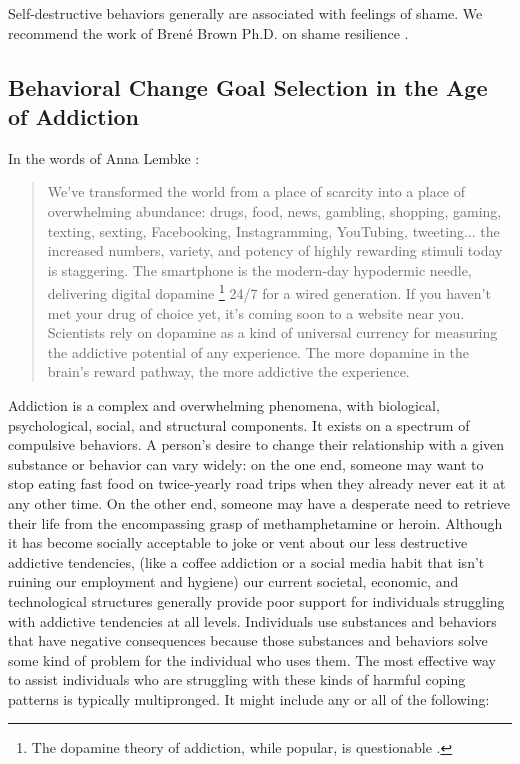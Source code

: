 \documentclass[12pt,letterpaper]{book}
\begin{document}
Self-destructive behaviors generally are associated with feelings of shame. We recommend the work of Brené Brown Ph.D. on shame resilience \cite{brownThought}.

\subsection*{Behavioral Change Goal Selection in the Age of Addiction}
In the words of Anna Lembke \cite{lembke2021dopamine}:
\begin{quotation}
    We've transformed the world from a place of scarcity into a place of overwhelming abundance: drugs, food, news, gambling, shopping, gaming, texting, sexting, Facebooking, Instagramming, YouTubing, tweeting... the increased numbers, variety, and potency of highly rewarding stimuli today is staggering. The smartphone is the modern-day hypodermic needle, delivering digital dopamine \footnote{The dopamine theory of addiction, while popular, is questionable \cite{nutt2015dopamine}.} 24/7 for a wired generation. If you haven't met your drug of choice yet, it's coming soon to a website near you. Scientists rely on dopamine as a kind of universal currency for measuring the addictive potential of any experience. The more dopamine in the brain's reward pathway, the more addictive the experience.
\end{quotation}

Addiction is a complex and overwhelming phenomena, with biological, psychological, social, and structural components. It exists on a spectrum of compulsive behaviors. A person's desire to change their relationship with a given substance or behavior can vary widely: on the one end, someone may want to stop eating fast food on twice-yearly road trips when they already never eat it at any other time. On the other end, someone may have a desperate need to retrieve their life from the encompassing grasp of methamphetamine or heroin. Although it has become socially acceptable to joke or vent about our less destructive addictive tendencies, (like a coffee addiction or a social media habit that isn't ruining our employment and hygiene) our current societal, economic, and technological structures generally provide poor support for individuals struggling with addictive tendencies at all levels. Individuals use substances and behaviors that have negative consequences because those substances and behaviors solve some kind of problem for the individual who uses them. The most effective way to assist individuals who are struggling with these kinds of harmful coping patterns is typically multipronged. It might include any or all of the following:
\end{document}

